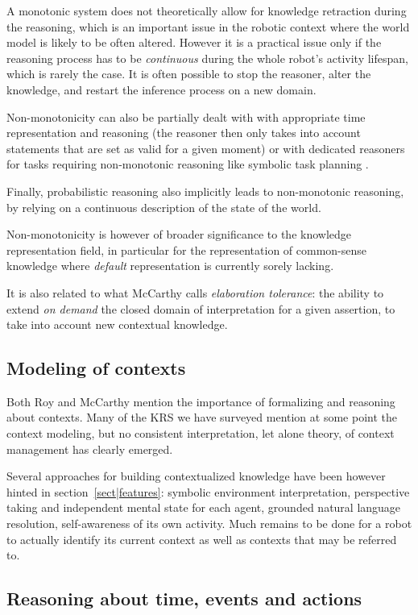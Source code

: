 \documentclass[journal]{IEEEtran}
\begin{document}
A monotonic system does not theoretically allow for knowledge retraction during
the reasoning, which is an important issue in the robotic context where the
world model is likely to be often altered.  However it is a practical issue
only if the reasoning process has to be \emph{continuous} during the whole
robot's activity lifespan, which is rarely the case. It is often possible to
stop the reasoner, alter the knowledge, and restart the inference process on a
new domain.

Non-monotonicity can also be partially dealt with with appropriate time
representation and reasoning (the reasoner then only takes into account
statements that are set as valid for a given moment) or with dedicated reasoners
for tasks requiring non-monotonic reasoning like symbolic task planning
.

Finally, probabilistic reasoning also implicitly leads to non-monotonic
reasoning, by relying on a continuous description of the state of the
world.

Non-monotonicity is however of broader significance to the knowledge
representation field, in particular for the representation of common-sense
knowledge where \emph{default} representation is currently sorely lacking.

It is also related to what McCarthy calls \emph{elaboration tolerance}: the
ability to extend \emph{on demand} the closed domain of interpretation for a
given assertion, to take into account new contextual knowledge.

\subsection{Modeling of contexts}

Both Roy and McCarthy mention the importance of formalizing and reasoning about
contexts. Many of the KRS we have surveyed mention at some point the context
modeling, but no consistent interpretation, let alone theory, of context
management has clearly emerged.

Several approaches for building contextualized knowledge have been however
hinted in section~\ref{sect|features}: symbolic environment interpretation,
perspective taking and independent mental state for each agent, grounded natural
language resolution, self-awareness of its own activity. Much remains to be done
for a robot to actually identify its current context as well as contexts that
may be referred to.

\subsection{Reasoning about time, events and actions}
\end{document}
